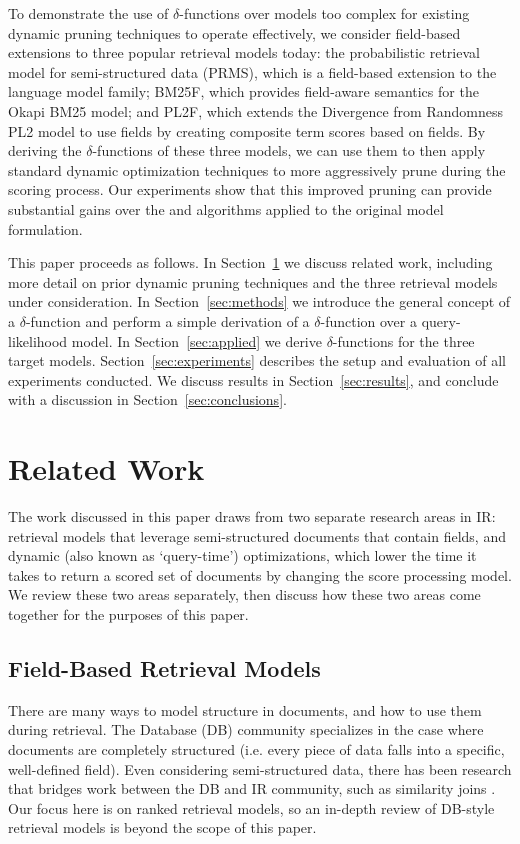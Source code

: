 \documentclass{sig-alternate}
\newcommand{\method}[1]{{\sc{#1}}}
\begin{document}
To demonstrate the use of $\delta$-functions over models too complex for existing dynamic pruning techniques to operate effectively, we consider field-based extensions to three popular retrieval models today: the probabilistic retrieval model for semi-structured data (PRMS), which is a field-based extension to the language model family; BM25F, which provides field-aware semantics for the Okapi BM25 model; and PL2F, which extends the Divergence from Randomness PL2 model to use fields by creating composite term scores based on fields. By deriving the $\delta$-functions of these three models, we can use them to then apply standard dynamic optimization techniques to more aggressively prune during the scoring process. Our experiments show that this improved pruning can provide substantial gains over the \method{maxscore} and \method{wand} algorithms applied to the original model formulation.

This paper proceeds as follows. In Section~\ref{sec:related} we discuss related work, including more detail on prior dynamic pruning techniques and the three retrieval models under consideration. In Section~\ref{sec:methods} we introduce the general concept of a $\delta$-function and perform a simple derivation of a $\delta$-function over a query-likelihood model. In Section~\ref{sec:applied} we derive $\delta$-functions for the three target models. Section~\ref{sec:experiments} describes the setup and evaluation of all experiments conducted. We discuss results in Section~\ref{sec:results}, and conclude with a discussion in Section~\ref{sec:conclusions}.

\section{Related Work} \label{sec:related}
The work discussed in this paper draws from two separate research areas in IR: retrieval models that leverage semi-structured documents that contain fields, and dynamic (also known as `query-time') optimizations, which lower the time it takes to return a scored set of documents by changing the score processing model. We review these two areas separately, then discuss how these two areas come together for the purposes of this paper. 
 
\subsection{Field-Based Retrieval Models}
There are many ways to model structure in documents, and how to use them during retrieval. The Database (DB) community specializes in the case where documents are completely structured (i.e. every piece of data falls into a specific, well-defined field). Even considering semi-structured data, there has been research that bridges work between the DB and IR community, such as similarity joins \cite{cohen-kdd-1998}. Our focus here is on ranked
retrieval models, so an in-depth review of DB-style retrieval models is beyond the scope of this paper.
 
\end{document}
